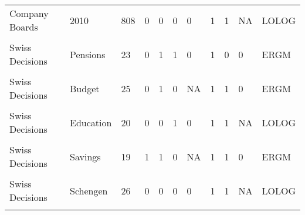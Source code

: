 \documentclass[
]{statsoc}
\begin{document}
\begin{longtable}[t]{lllllllllll}
Company Boards & 2010 & 808 & 0 & 0 & 0 & 0 & 1 & 1 & NA & LOLOG\\
\addlinespace
\cellcolor{gray!6}{Swiss Decisions} & \cellcolor{gray!6}{Nuclear} & \cellcolor{gray!6}{24} & \cellcolor{gray!6}{0} & \cellcolor{gray!6}{1} & \cellcolor{gray!6}{0} & \cellcolor{gray!6}{NA} & \cellcolor{gray!6}{1} & \cellcolor{gray!6}{1} & \cellcolor{gray!6}{1} & \cellcolor{gray!6}{ERGM}\\
Swiss Decisions & Pensions & 23 & 0 & 1 & 1 & 0 & 1 & 0 & 0 & ERGM\\
\cellcolor{gray!6}{Swiss Decisions} & \cellcolor{gray!6}{Foreigners} & \cellcolor{gray!6}{20} & \cellcolor{gray!6}{0} & \cellcolor{gray!6}{1} & \cellcolor{gray!6}{0} & \cellcolor{gray!6}{NA} & \cellcolor{gray!6}{1} & \cellcolor{gray!6}{0} & \cellcolor{gray!6}{0} & \cellcolor{gray!6}{ERGM}\\
Swiss Decisions & Budget & 25 & 0 & 1 & 0 & NA & 1 & 1 & 0 & ERGM\\
\cellcolor{gray!6}{Swiss Decisions} & \cellcolor{gray!6}{Equality} & \cellcolor{gray!6}{24} & \cellcolor{gray!6}{0} & \cellcolor{gray!6}{0} & \cellcolor{gray!6}{0} & \cellcolor{gray!6}{NA} & \cellcolor{gray!6}{1} & \cellcolor{gray!6}{1} & \cellcolor{gray!6}{0} & \cellcolor{gray!6}{LOLOG}\\
\addlinespace
Swiss Decisions & Education & 20 & 0 & 0 & 1 & 0 & 1 & 1 & NA & LOLOG\\
\cellcolor{gray!6}{Swiss Decisions} & \cellcolor{gray!6}{Telecoms} & \cellcolor{gray!6}{22} & \cellcolor{gray!6}{0} & \cellcolor{gray!6}{0} & \cellcolor{gray!6}{0} & \cellcolor{gray!6}{NA} & \cellcolor{gray!6}{1} & \cellcolor{gray!6}{1} & \cellcolor{gray!6}{NA} & \cellcolor{gray!6}{LOLOG}\\
Swiss Decisions & Savings & 19 & 1 & 1 & 0 & NA & 1 & 1 & 0 & ERGM\\
\cellcolor{gray!6}{Swiss Decisions} & \cellcolor{gray!6}{Persons} & \cellcolor{gray!6}{26} & \cellcolor{gray!6}{0} & \cellcolor{gray!6}{1} & \cellcolor{gray!6}{0} & \cellcolor{gray!6}{NA} & \cellcolor{gray!6}{1} & \cellcolor{gray!6}{1} & \cellcolor{gray!6}{0} & \cellcolor{gray!6}{ERGM}\\
Swiss Decisions & Schengen & 26 & 0 & 0 & 0 & 0 & 1 & 1 & NA & LOLOG\\
\addlinespace
\cellcolor{gray!6}{University Emails} & \cellcolor{gray!6}{} & \cellcolor{gray!6}{1133} & \cellcolor{gray!6}{0} & \cellcolor{gray!6}{0} & \cellcolor{gray!6}{0} & \cellcolor{gray!6}{0} & \cellcolor{gray!6}{0} & \cellcolor{gray!6}{0} & \cellcolor{gray!6}{NA} & \cellcolor{gray!6}{Neither}\\

\end{longtable}
\end{document}
